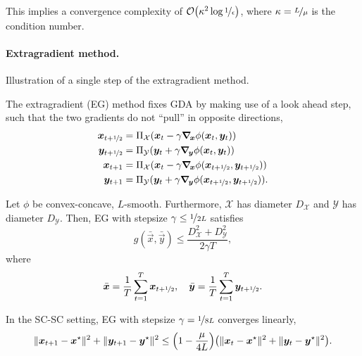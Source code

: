 This implies a convergence complexity of $\bigo{\kappa^2 \log \nicefrac{1}{\epsilon}}$, where
$\kappa = \nicefrac{L}{\mu}$ is the condition number.

\paragraph{Extragradient method.}

\begin{marginfigure}
    \centering
    \caption{Illustration of a single step of the extragradient method.}
    \label{fig:extragradient-method}
\end{marginfigure}

The extragradient (EG) method fixes GDA by making use of a look ahead step, such that the two
gradients do not ``pull'' in opposite directions,
\begin{align*}
    \vec{x}_{t+\nicefrac{1}{2}} & = \Pi_{\mathcal{X}}(\vec{x}_t - \gamma \grad{\phi(\vec{x}_t, \vec{y}_t)}{\vec{x}})                                      \\
    \vec{y}_{t+\nicefrac{1}{2}} & = \Pi_{\mathcal{Y}}(\vec{y}_t + \gamma \grad{\phi(\vec{x}_t, \vec{y}_t)}{\vec{y}})                                      \\
    \vec{x}_{t+1}               & = \Pi_{\mathcal{X}}(\vec{x}_t - \gamma \grad{\phi(\vec{x}_{t+\nicefrac{1}{2}}, \vec{y}_{t+\nicefrac{1}{2}})}{\vec{x}})  \\
    \vec{y}_{t+1}               & = \Pi_{\mathcal{Y}}(\vec{y}_t + \gamma \grad{\phi(\vec{x}_{t+\nicefrac{1}{2}}, \vec{y}_{t+\nicefrac{1}{2}})}{\vec{y}}).
\end{align*}

\begin{theorem}[Convergence of EG, C-C]
    Let $\phi$ be convex-concave, $L$-smooth. Furthermore, $\mathcal{X}$ has diameter $D_{\mathcal{X}}$ and $\mathcal{Y}$ has diameter $D_{\mathcal{Y}}$. Then, EG with stepsize $\gamma \leq \nicefrac{1}{2L}$ satisfies \[
        g(\bar{\vec{x}}, \bar{\vec{y}}) \leq \frac{D_{\mathcal{X}}^2 + D_{\mathcal{Y}}^2}{2 \gamma T},
    \]
    where \[
        \bar{\vec{x}} = \frac{1}{T} \sum_{t=1}^{T} \vec{x}_{t+\nicefrac{1}{2}}, \quad \bar{\vec{y}} = \frac{1}{T} \sum_{t=1}^{T} \vec{y}_{t+\nicefrac{1}{2}}.
    \]
\end{theorem}

\begin{theorem}[Convergence of EG, SC-SC]
    In the SC-SC setting, EG with stepsize $\gamma = \nicefrac{1}{8L}$ converges linearly, \[
        \| \vec{x}_{t+1} - \vec{x}^\star \|^2 + \| \vec{y}_{t+1} - \vec{y}^\star \|^2 \leq \lft( 1 - \frac{\mu}{4L} \rgt) \lft( \| \vec{x}_t - \vec{x}^\star \|^2 + \| \vec{y}_t - \vec{y}^\star \|^2 \rgt).
    \]
\end{theorem}


